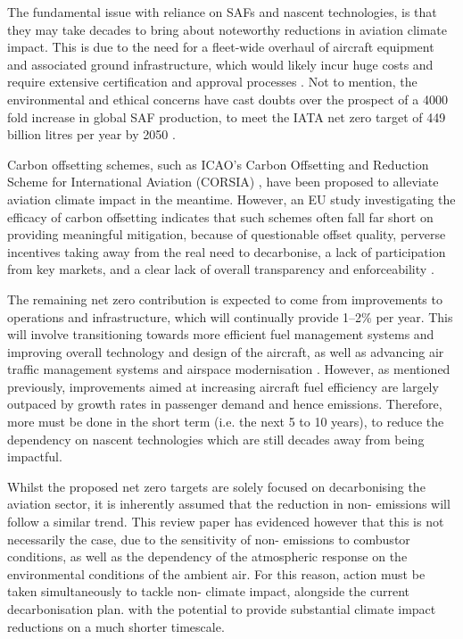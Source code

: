 The fundamental issue with reliance on SAFs and nascent technologies, is that they may take decades to bring about noteworthy reductions in aviation climate impact. This is due to the need for a fleet-wide overhaul of aircraft equipment and associated ground infrastructure, which would likely incur huge costs and require extensive certification and approval processes \cite{}. Not to mention, the environmental and ethical concerns have cast doubts over the prospect of a 4000 fold increase in global SAF production, to meet the IATA net zero target of 449 billion litres per year by 2050 \cite{Henoi2022}. 


Carbon offsetting schemes, such as ICAO's Carbon Offsetting and Reduction Scheme for International Aviation (CORSIA) \cite{CORSIA}, have been proposed to alleviate aviation climate impact in the meantime. However, an EU study investigating the efficacy of carbon offsetting indicates that such schemes often fall far short on providing meaningful mitigation, because of questionable offset quality, perverse incentives taking away from the real need to decarbonise, a lack of participation from key markets, and a clear lack of overall transparency and enforceability \cite{TandE2021, TandE2020}.

The remaining net zero contribution is expected to come from improvements to operations and infrastructure, which will continually provide 1--2\% per year. This will involve transitioning towards more efficient fuel management systems and improving overall technology and design of the aircraft, as well as advancing air traffic management systems and airspace modernisation \cite{}. However, as mentioned previously, improvements aimed at increasing aircraft fuel efficiency are largely outpaced by growth rates in passenger demand and hence emissions. Therefore, more must be done in the short term (i.e. the next 5 to 10 years), to reduce the dependency on nascent technologies which are still decades away from being impactful.


Whilst the proposed net zero targets are solely focused on decarbonising the aviation sector, it is inherently assumed that the reduction in non- emissions will follow a similar trend. This review paper has evidenced however that this is not necessarily the case, due to the sensitivity of non- emissions to combustor conditions, as well as the dependency of the atmospheric response on the environmental conditions of the ambient air. For this reason, action must be taken simultaneously to tackle non- climate impact, alongside the current decarbonisation plan. with the potential to provide substantial climate impact reductions on a much shorter timescale.


